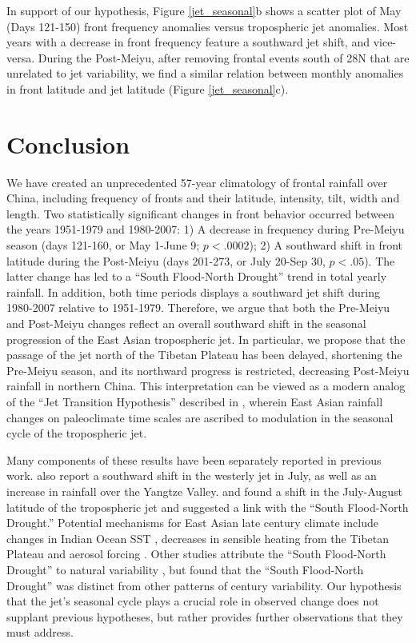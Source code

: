 \documentclass[draft,grl]{AGUTeX}
\begin{document}
\begin{article}
	In support of our hypothesis, Figure \ref{jet_seasonal}b shows a scatter plot of May (Days 121-150) front frequency anomalies versus tropospheric jet anomalies. Most years with a decrease in front frequency feature a southward jet shift, and vice-versa. During the Post-Meiyu, after removing frontal events south of 28\textdegree N that are unrelated to jet variability, we find a similar relation between monthly anomalies in front latitude and jet latitude (Figure \ref{jet_seasonal}c).
		
\section{Conclusion}

	We have created an unprecedented 57-year climatology of frontal rainfall over China, including frequency of fronts and their latitude, intensity, tilt, width and length. Two statistically significant changes in front behavior occurred between the years 1951-1979 and 1980-2007: 1) A decrease in frequency during Pre-Meiyu season (days 121-160, or May 1-June 9; $p < .0002$); 2) A southward shift in front latitude during the Post-Meiyu (days 201-273, or July 20-Sep 30, $p<.05$). The latter change has led to a ``South Flood-North Drought'' trend in total yearly rainfall. In addition, both time periods displays a southward jet shift during 1980-2007 relative to 1951-1979. Therefore, we argue that both the Pre-Meiyu and Post-Meiyu changes reflect an overall southward shift in the seasonal progression of the East Asian tropospheric jet. In particular, we propose that the passage of the jet north of the Tibetan Plateau has been delayed, shortening the Pre-Meiyu season, and its northward progress is restricted, decreasing Post-Meiyu rainfall in northern China. This interpretation can be viewed as a modern analog of the ``Jet Transition Hypothesis'' described in \citet{Chiang2015}, wherein East Asian rainfall changes on paleoclimate time scales are ascribed to modulation in the seasonal cycle of the tropospheric jet. 
	
	Many components of these results have been separately reported in previous work. \citet{Xuan2011} also report a southward shift in the westerly jet in July, as well as an increase in rainfall over the Yangtze Valley. \citet{Yu2004} and \citet{Yu2007} found a shift in the July-August latitude of the tropospheric jet and suggested a link with the ``South Flood-North Drought.'' Potential mechanisms for East Asian late  century climate include changes in Indian Ocean SST \citep{Qu2012}, decreases in sensible heating from the Tibetan Plateau \citep{Liu2012a,Hu2015} and aerosol forcing \citep{Song2014}. Other studies attribute the ``South Flood-North Drought'' to natural variability \citep{Zhang1999,Xin2006,Lei2014}, but \citet{Zhou2009} found that the ``South Flood-North Drought'' was distinct from other patterns of  century variability. Our hypothesis that the jet's seasonal cycle plays a crucial role in observed change does not supplant previous hypotheses, but rather provides further observations that they must address.
	

\end{article}
\end{document}
